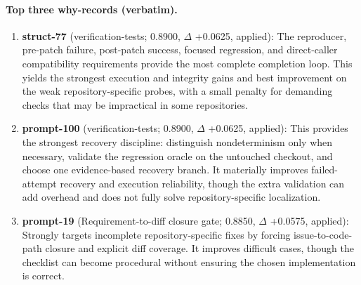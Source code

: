 \paragraph{Top three why-records (verbatim).}\begin{enumerate}\itemsep1pt
\item \textbf{struct-77} (verification-tests; 0.8900, $\Delta$ +0.0625, applied): The reproducer, pre-patch failure, post-patch success, focused regression, and direct-caller compatibility requirements provide the most complete completion loop. This yields the strongest execution and integrity gains and best improvement on the weak repository-specific probes, with a small penalty for demanding checks that may be impractical in some repositories.
\item \textbf{prompt-100} (verification-tests; 0.8900, $\Delta$ +0.0625, applied): This provides the strongest recovery discipline: distinguish nondeterminism only when necessary, validate the regression oracle on the untouched checkout, and choose one evidence-based recovery branch. It materially improves failed-attempt recovery and execution reliability, though the extra validation can add overhead and does not fully solve repository-specific localization.
\item \textbf{prompt-19} (Requirement-to-diff closure gate; 0.8850, $\Delta$ +0.0575, applied): Strongly targets incomplete repository-specific fixes by forcing issue-to-code-path closure and explicit diff coverage. It improves difficult cases, though the checklist can become procedural without ensuring the chosen implementation is correct.
\end{enumerate}
